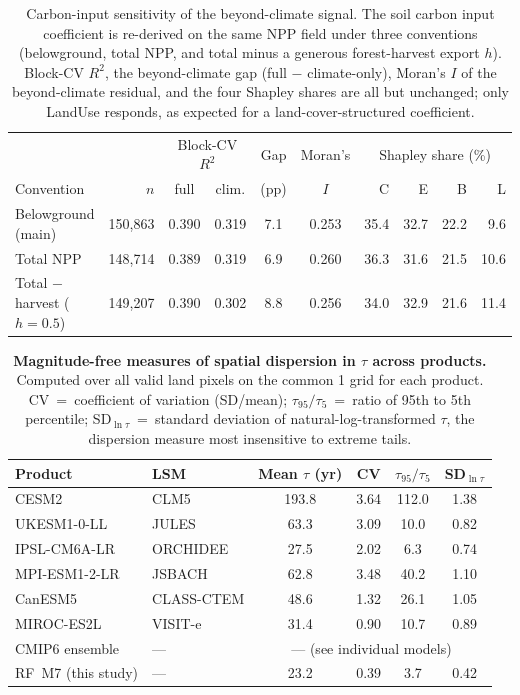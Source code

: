 \documentclass[12pt, a4paper]{article}
\begin{document}
\begin{table}[h!]
\centering
\small
\caption{Carbon-input sensitivity of the beyond-climate signal. The soil carbon input coefficient is re-derived on the same NPP field under three conventions (belowground, total NPP, and total minus a generous forest-harvest export $h$). Block-CV $R^2$, the beyond-climate gap (full $-$ climate-only), Moran's $I$ of the beyond-climate residual, and the four Shapley shares are all but unchanged; only LandUse responds, as expected for a land-cover-structured coefficient.}
\label{tab:input_sensitivity}
\begin{tabular}{lrccccrrrr}
\toprule
 & & \multicolumn{2}{c}{Block-CV $R^2$} & Gap & Moran's & \multicolumn{4}{c}{Shapley share (\%)} \\
\cmidrule(lr){3-4}\cmidrule(lr){7-10}
Convention & $n$ & full & clim. & (pp) & $I$ & C & E & B & L \\
\midrule
Belowground (main) & 150,863 & 0.390 & 0.319 & 7.1 & 0.253 & 35.4 & 32.7 & 22.2 & 9.6 \\
Total NPP & 148,714 & 0.389 & 0.319 & 6.9 & 0.260 & 36.3 & 31.6 & 21.5 & 10.6 \\
Total $-$ harvest ($h{=}0.5$) & 149,207 & 0.390 & 0.302 & 8.8 & 0.256 & 34.0 & 32.9 & 21.6 & 11.4 \\
\bottomrule
\end{tabular}
\end{table}

\begin{table}[h!]
  \centering
  \small
  \caption{%
    \textbf{Magnitude-free measures of spatial dispersion in $\tau$
    across products.}
    Computed over all valid land pixels on the common 1\textdegree{}
    grid for each product. CV~=~coefficient of variation (SD/mean);
    $\tau_{95}/\tau_{5}$~=~ratio of 95th to 5th percentile;
    SD$_{\ln \tau}$~=~standard deviation of natural-log-transformed $\tau$,
    the dispersion measure most insensitive to extreme tails.
  }
  \label{tab:esm_dispersion}
  \begin{tabular}{llcccc}
    \toprule
    Product & LSM & Mean $\tau$ (yr) & CV & $\tau_{95}/\tau_{5}$ &
    SD$_{\ln \tau}$ \\
    \midrule
    CESM2          & CLM5         & 193.8 & 3.64 & 112.0 & 1.38 \\
    UKESM1-0-LL    & JULES        &  63.3 & 3.09 &  10.0 & 0.82 \\
    IPSL-CM6A-LR   & ORCHIDEE     &  27.5 & 2.02 &   6.3 & 0.74 \\
    MPI-ESM1-2-LR  & JSBACH       &  62.8 & 3.48 &  40.2 & 1.10 \\
    CanESM5        & CLASS-CTEM   &  48.6 & 1.32 &  26.1 & 1.05 \\
    MIROC-ES2L     & VISIT-e      &  31.4 & 0.90 &  10.7 & 0.89 \\
    \midrule
    CMIP6 ensemble & ---          & \multicolumn{4}{c}{--- (see individual models)} \\
    RF~M7 (this study) & ---      &  23.2 & 0.39 &   3.7 & 0.42 \\
    \bottomrule
  \end{tabular}
\end{table}
\end{document}
